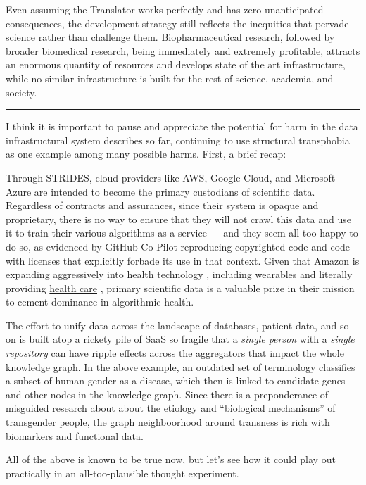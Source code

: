 \documentclass[11pt]{article}
\begin{document}
\begin{multicols}{2}
Even assuming the Translator works perfectly and has zero unanticipated
consequences, the development strategy still reflects the inequities
that pervade science rather than challenge them. Biopharmaceutical
research, followed by broader biomedical research, being immediately and
extremely profitable, attracts an enormous quantity of resources and
develops state of the art infrastructure, while no similar
infrastructure is built for the rest of science, academia, and society.

\begin{center}\rule{0.5\linewidth}{0.5pt}\end{center}

I think it is important to pause and appreciate the potential for harm
in the data infrastructural system describes so far, continuing to use
structural transphobia as one example among many possible harms. First,
a brief recap:

Through STRIDES, cloud providers like AWS, Google Cloud, and Microsoft
Azure are intended to become the primary custodians of scientific data.
Regardless of contracts and assurances, since their system is opaque and
proprietary, there is no way to ensure that they will not crawl this
data and use it to train their various algorithms-as-a-service --- and
they seem all too happy to do so, as evidenced by GitHub Co-Pilot
reproducing copyrighted code and code with licenses that explicitly
forbade its use in that context. Given that Amazon is expanding
aggressively into health technology\cite{AWSAnnouncesAWS2021} ,
including wearables and literally providing
\href{https://amazon.care/}{health care} \cite{lermanAmazonBuiltIts2021} , primary scientific data is a valuable
prize in their mission to cement dominance in algorithmic health.

The effort to unify data across the landscape of databases, patient
data, and so on is built atop a rickety pile of SaaS so fragile that a
\emph{single person} with a \emph{single repository} can have ripple
effects across the aggregators that impact the whole knowledge graph. In
the above example, an outdated set of terminology classifies a subset of
human gender as a disease, which then is linked to candidate genes and
other nodes in the knowledge graph. Since there is a preponderance of
misguided research about about the etiology and ``biological
mechanisms'' of transgender people, the graph neighboorhood around
transness is rich with biomarkers and functional data.

All of the above is known to be true now, but let's see how it could
play out practically in an all-too-plausible thought experiment.


\end{multicols}
\end{document}
